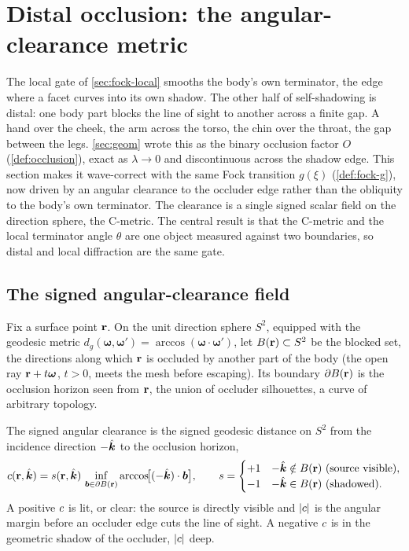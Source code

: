 \section{Distal occlusion: the angular-clearance metric}\label{sec:cmetric}

The local gate of \cref{sec:fock-local} smooths the body's own terminator, the
edge where a facet curves into its own shadow. The other half of self-shadowing
is distal: one body part blocks the line of sight to another across a finite gap.
A hand over the cheek, the arm across the torso, the chin over the throat, the gap
between the legs. \cref{sec:geom} wrote this as the binary occlusion factor $O$
(\cref{def:occlusion}), exact as $\lambda\to0$ and discontinuous across the shadow
edge. This section makes it wave-correct with the same Fock transition $g(\xi)$
(\cref{def:fock-g}), now driven by an angular clearance to the occluder edge
rather than the obliquity to the body's own terminator. The clearance is a single
signed scalar field on the direction sphere, the C-metric. The central result is
that the C-metric and the local terminator angle $\theta$ are one object measured
against two boundaries, so distal and local diffraction are the same gate.

\subsection{The signed angular-clearance field}\label{sec:cmetric-def}

Fix a surface point $\mathbf{r}$. On the unit direction sphere $S^2$, equipped with the
geodesic metric $d_g(\bm{\omega},\bm{\omega}')=\arccos(\bm{\omega}\cdot\bm{\omega}')$,
let $B(\mathbf{r})\subset S^2$ be the blocked set, the directions along which $\mathbf{r}$ is
occluded by another part of the body (the open ray $\mathbf{r}+t\bm{\omega}$, $t>0$, meets
the mesh before escaping). Its boundary $\partial B(\mathbf{r})$ is the occlusion horizon
seen from $\mathbf{r}$, the union of occluder silhouettes, a curve of arbitrary topology.

\begin{definition}\label{def:c-metric}
The signed angular clearance is the signed geodesic distance on $S^2$ from the
incidence direction $-\hat{\bm{k}}$ to the occlusion horizon,
\begin{equation}\label{eq:c-def}
  c(\mathbf{r},\hat{\bm{k}}) = s(\mathbf{r},\hat{\bm{k}})\,
  \inf_{\bm{b}\in\partial B(\mathbf{r})}\arccos\!\bigl[(-\hat{\bm{k}})\cdot\bm{b}\bigr],
  \qquad
  s = \begin{cases}
    +1 & -\hat{\bm{k}}\notin B(\mathbf{r})\ \text{(source visible)},\\
    -1 & -\hat{\bm{k}}\in B(\mathbf{r})\ \text{(shadowed)}.
  \end{cases}
\end{equation}
A positive $c$ is lit, or clear: the source is directly visible and $\abs{c}$
is the angular margin before an occluder edge cuts the line of sight. A negative
$c$ is in the geometric shadow of the occluder, $\abs{c}$ deep.
\end{definition}

